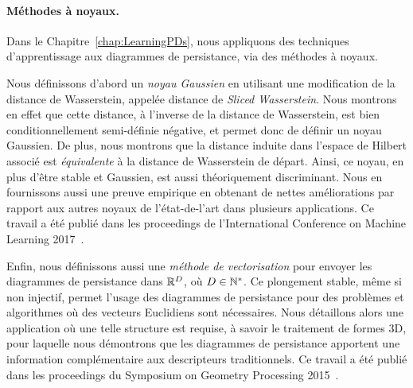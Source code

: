 
\paragraph*{M\'ethodes \`a noyaux.} Dans le Chapitre~\ref{chap:LearningPDs}, nous appliquons des techniques d'apprentissage aux diagrammes
de persistance, via des m\'ethodes \`a noyaux.

Nous d\'efinissons d'abord un {\em noyau Gaussien} en utilisant une modification de la distance de Wasserstein, appel\'ee distance de 
{\em Sliced Wasserstein}. Nous montrons en effet que cette distance, \`a l'inverse de la distance de Wasserstein, est
bien conditionnellement semi-d\'efinie n\'egative, et permet donc de d\'efinir un noyau Gaussien. De plus, nous montrons que la distance induite
dans l'espace de Hilbert associ\'e est {\em \'equivalente} \`a la distance de Wasserstein de d\'epart.
Ainsi, ce noyau, en plus d'\^etre stable et Gaussien, est aussi th\'eoriquement discriminant. Nous en fournissons aussi une preuve empirique
en obtenant de nettes am\'eliorations par rapport aux autres noyaux de l'\'etat-de-l'art dans plusieurs applications. Ce travail a \'et\'e publi\'e 
dans les proceedings de l'International Conference on Machine Learning 2017~\cite{Carriere17e}.

Enfin, nous d\'efinissons aussi une {\em m\'ethode de vectorisation} pour envoyer les diagrammes de persistance dans  $\mathbb{R}^D$, o\`u $D\in\mathbb{N}^*$.
Ce plongement stable, m\^eme si non injectif, permet l'usage des diagrammes de persistance pour des probl\`emes et algorithmes o\`u des
vecteurs Euclidiens sont n\'ecessaires. Nous d\'etaillons alors une application o\`u une telle structure est requise, \`a savoir
le traitement de formes 3D, pour laquelle nous d\'emontrons que les diagrammes de persistance apportent une information compl\'ementaire
aux descripteurs traditionnels. Ce travail a \'et\'e publi\'e dans les proceedings du Symposium on Geometry Processing 2015~\cite{Carriere15a}. 


